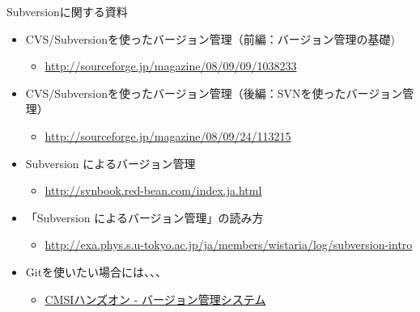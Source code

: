 \documentclass[dvipdfmx]{beamer}
\begin{document}
\begin{frame}[t,fragile]{Subversionに関する資料}
  \begin{itemize}
  \item CVS/Subversionを使ったバージョン管理（前編：バージョン管理の基礎)
    \begin{itemize}
    \item \url{http://sourceforge.jp/magazine/08/09/09/1038233}
    \end{itemize}
  \item CVS/Subversionを使ったバージョン管理（後編：SVNを使ったバージョン管理）
    \begin{itemize}
      \item \url{http://sourceforge.jp/magazine/08/09/24/113215}
    \end{itemize}
  \item Subversion によるバージョン管理
    \begin{itemize}
      \item \url{http://svnbook.red-bean.com/index.ja.html}
    \end{itemize}
  \item 「Subversion によるバージョン管理」の読み方
    \begin{itemize}
      \item \url{http://exa.phys.s.u-tokyo.ac.jp/ja/members/wistaria/log/subversion-intro}
    \end{itemize}
  \item Gitを使いたい場合には、、、
    \begin{itemize}
      \item \href{http://www.cms-initiative.jp/ja/research-support/develop-support/how-to-publish/develop-apps/dt0l33/manage-version}{CMSIハンズオン - バージョン管理システム}
    \end{itemize}
  \end{itemize}
\end{frame}
\end{document}
